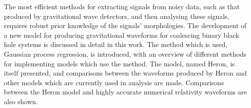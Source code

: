   The most efficient methods for extracting signals from noisy data, such as that produced by gravitational wave detectors, and then analysing these signals, requires robust prior knowledge of the signals' morphologies.
  The development of a new model for producing gravitational waveforms for coalescing binary black hole systems is discussed in detail in this work.
  The method which is used, Gaussian process regression, is introduced, with an overview of different methods for implementing models which use the method.
  The model, named Heron, is itself presented, and comparisons between the waveforms produced by Heron and other models which are currently used in analysis are made.
  Comparisons between the Heron model and highly accurate numerical relativity waveforms are also shown.
